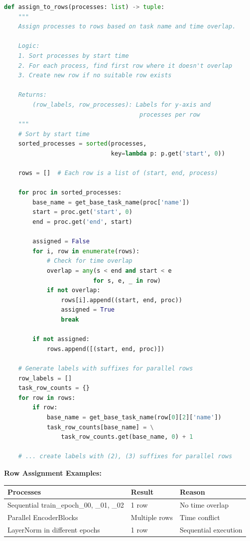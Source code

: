 \documentclass[11pt,a4paper]{article}
\begin{document}
\begin{lstlisting}[language=Python]
def assign_to_rows(processes: list) -> tuple:
    """
    Assign processes to rows based on task name and time overlap.
    
    Logic:
    1. Sort processes by start time
    2. For each process, find first row where it doesn't overlap
    3. Create new row if no suitable row exists
    
    Returns:
        (row_labels, row_processes): Labels for y-axis and 
                                      processes per row
    """
    # Sort by start time
    sorted_processes = sorted(processes, 
                              key=lambda p: p.get('start', 0))
    
    rows = []  # Each row is a list of (start, end, process)
    
    for proc in sorted_processes:
        base_name = get_base_task_name(proc['name'])
        start = proc.get('start', 0)
        end = proc.get('end', start)
        
        assigned = False
        for i, row in enumerate(rows):
            # Check for time overlap
            overlap = any(s < end and start < e 
                         for s, e, _ in row)
            if not overlap:
                rows[i].append((start, end, proc))
                assigned = True
                break
        
        if not assigned:
            rows.append([(start, end, proc)])
    
    # Generate labels with suffixes for parallel rows
    row_labels = []
    task_row_counts = {}
    for row in rows:
        if row:
            base_name = get_base_task_name(row[0][2]['name'])
            task_row_counts[base_name] = \
                task_row_counts.get(base_name, 0) + 1
    
    # ... create labels with (2), (3) suffixes for parallel rows
\end{lstlisting}

\textbf{Row Assignment Examples:}

\begin{table}[h]
\centering
\begin{tabular}{@{}lll@{}}
\toprule
\textbf{Processes} & \textbf{Result} & \textbf{Reason} \\
\midrule
Sequential train\_epoch\_00, \_01, \_02 & 1 row & No time overlap \\
Parallel EncoderBlocks & Multiple rows & Time conflict \\
LayerNorm in different epochs & 1 row & Sequential execution \\
\bottomrule
\end{tabular}
\end{table}
\end{document}
